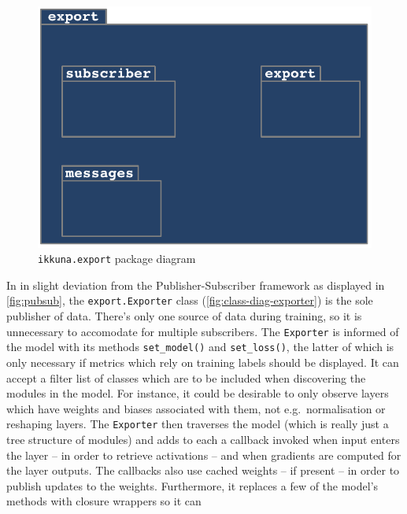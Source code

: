 \begin{figure}
    \hypertarget{fig:pack-diag-export}{%
        \centering
        \includegraphics[max width=.5\textwidth]{gfx/diagrams/class_diagrams/export_package_diagram.pdf}
        \caption{\texttt{ikkuna.export} package diagram}\label{fig:pack-diag-export}
    }
\end{figure}

In in slight deviation from the Publisher-Subscriber framework as
displayed in \cref{fig:pubsub}, the
\texttt{export.Exporter} class
(\cref{fig:class-diag-exporter}) is the sole publisher of data. There's
only one source of data during training, so it is unnecessary to
accomodate for multiple subscribers. The
\texttt{Exporter} is informed of the model with its
methods \texttt{set\_model()} and
\texttt{set\_loss()}, the latter of which is only
necessary if metrics which rely on training labels should be displayed.
It can accept a filter list of classes which are to be included when
discovering the modules in the model. For instance, it could be
desirable to only observe layers which have weights and biases
associated with them, not e.g.~normalisation or reshaping layers. The
\texttt{Exporter} then traverses the model (which is
really just a tree structure of modules) and adds to each a callback
invoked when input enters the layer -- in order to retrieve activations
-- and when gradients are computed for the layer outputs. The callbacks
also use cached weights -- if present -- in order to publish updates to
the weights. Furthermore, it replaces a few of the model's methods with
closure wrappers so it can

